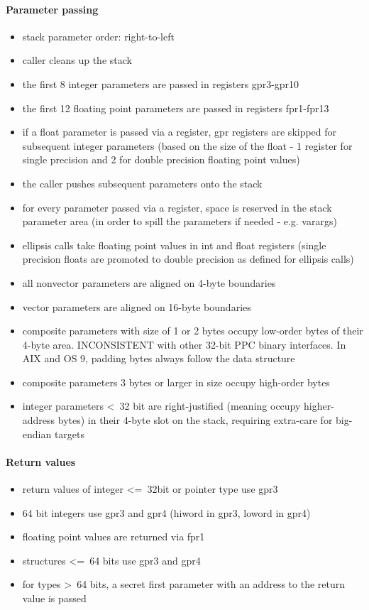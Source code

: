 \paragraph{Parameter passing}

\begin{itemize}
\item stack parameter order: right-to-left
\item caller cleans up the stack
\item the first 8 integer parameters are passed in registers gpr3-gpr10
\item the first 12 floating point parameters are passed in registers fpr1-fpr13
\item if a float parameter is passed via a register, gpr registers are skipped for subsequent integer parameters (based on the size of
the float - 1 register for single precision and 2 for double precision floating point values)
\item the caller pushes subsequent parameters onto the stack
\item for every parameter passed via a register, space is reserved in the stack parameter area (in order to spill the parameters if
needed - e.g. varargs)
\item ellipsis calls take floating point values in int and float registers (single precision floats are promoted to double precision
as defined for ellipsis calls)
\item all nonvector parameters are aligned on 4-byte boundaries
\item vector parameters are aligned on 16-byte boundaries
\item composite parameters with size of 1 or 2 bytes occupy low-order bytes of their 4-byte area. INCONSISTENT with other 32-bit PPC
binary interfaces. In AIX and OS 9, padding bytes always follow the data structure
\item composite parameters 3 bytes or larger in size occupy high-order bytes
\item integer parameters \textless\ 32 bit are right-justified (meaning occupy higher-address bytes) in their 4-byte slot on the stack, requiring extra-care for big-endian targets
\end{itemize}


\paragraph{Return values}

\begin{itemize}
\item return values of integer \textless=\ 32bit or pointer type use gpr3
\item 64 bit integers use gpr3 and gpr4 (hiword in gpr3, loword in gpr4)
\item floating point values are returned via fpr1
\item structures \textless=\ 64 bits use gpr3 and gpr4
\item for types \textgreater\ 64 bits, a secret first parameter with an address to the return value is passed
\end{itemize}

